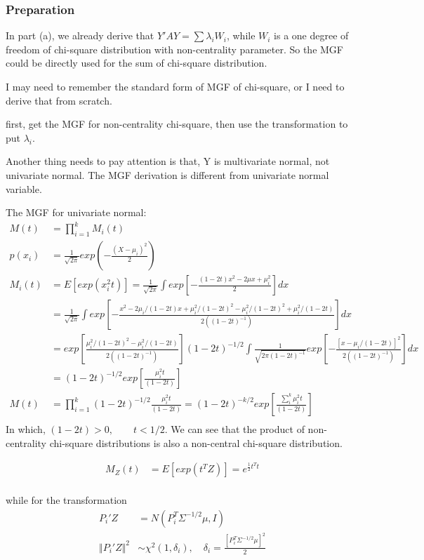 \documentclass[11pt]{article} %
\begin{document}
\subsubsection{Preparation}	
In part (a), we already derive that $Y'AY = \sum \lambda_i W_i$, while $W_i$ is a one degree of freedom of chi-square distribution with non-centrality parameter. So the MGF could be directly used for the sum of chi-square distribution. 

I may need to remember the standard form of MGF of chi-square, or I need to derive that from scratch.

first, get the MGF for non-centrality chi-square, then use the transformation to put $\lambda_i$.

Another thing needs to pay attention is that, Y is multivariate normal, not univariate normal. The MGF derivation is different from univariate normal variable. 

The MGF for univariate normal:
	\begin{align*}
	M(t) &= \prod_{i=1}^k M_i(t) \\
	p(x_i) &= \frac{1}{\sqrt{2\pi}} exp(-\frac{(X-\mu_i)^2}{2})\\
	M_i(t)	&= E[exp(x_i^2 t)]= \frac{1}{\sqrt{2\pi}} \int exp[- \frac{(1-2t)x^2 - 2\mu x + \mu_i^2}{2}] dx\\
	&= \frac{1}{\sqrt{2\pi}} \int  exp[- \frac{x^2 - 2\mu_i/(1-2t) x + \mu_i^2/(1-2t)^2 - \mu_i^2/(1-2t)^2 + \mu_i^2/(1-2t)}{2 ((1-2t)^{-1})}] dx\\
	&= exp[\frac{\mu_i^2/(1-2t)^2 - \mu_i^2/(1-2t)}{2 ((1-2t)^{-1})}] (1-2t)^{-1/2} \int \frac{1}{\sqrt{2\pi (1-2t)^{-1}}} exp[- \frac{[x- \mu_i/(1-2t)]^2}{2 ((1-2t)^{-1})}] dx\\
	&= (1-2t)^{-1/2} exp[\frac{\mu_i^2 t}{(1-2t)}]\\
	M(t) &= \prod_{i=1}^k (1-2t)^{-1/2} \frac{\mu_i^2 t}{(1-2t)} = (1-2t)^{-k/2} exp[\frac{\sum_i^k \mu_i^2 t}{(1-2t)}] \\
\end{align*}  
In which, $(1-2t) > 0, \qquad t< 1/2$. We can see that the product of non-centrality chi-square distributions is also a non-central chi-square distribution.


 \begin{align*}
 	M_Z(t)	&= E[ exp(t^T Z) ]=  e^{\frac{1}{2} t^T t} \\
 \end{align*}  

while for the transformation 
\begin{align*}
	P_i' Z &=  N( P_i^T \Sigma^{-1/2} \mu, I )\\
	\Vert P_i' Z \Vert^2  & \sim \chi^2 (1, \delta_i), \quad  \delta_i = \frac{[P_i^T \Sigma^{-1/2} \mu]^2}{2} 
\end{align*} 
\end{document}
